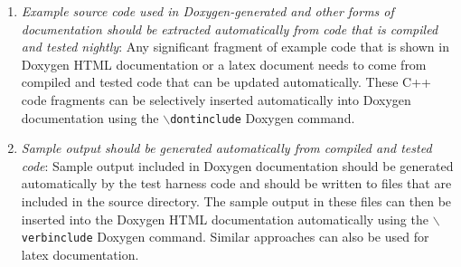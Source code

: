 \begin{enumerate}
{\begin{verbatim}
    /** \name Overriden from Teuchos::ParameterListAccpetor */
    //@{

    /** \brief . */
    void setParameterList(
      Teuchos::RefCountPtr<Teuchos::ParameterList> const& paramList);
    /** \brief . */
    Teuchos::RefCountPtr<Teuchos::ParameterList> getParameterList();
    /** \brief . */
    Teuchos::RefCountPtr<Teuchos::ParameterList> unsetParameterList();
    /** \brief . */
    Teuchos::RefCountPtr<const Teuchos::ParameterList> getParameterList() const;
    /** \brief . */
    Teuchos::RefCountPtr<const Teuchos::ParameterList> getValidParameters() const;

    //@}

    ...

  };

\end{verbatim}}

{}\item\textit{Example source code used in Doxygen-generated and other forms
of documentation should be extracted automatically from code that is compiled
and tested nightly}: Any significant fragment of example code that is shown in
Doxygen HTML documentation or a latex document needs to come from compiled and
tested code that can be updated automatically.  These C++ code fragments can
be selectively inserted automatically into Doxygen documentation using the
{}\texttt{$\backslash$dontinclude} Doxygen command.

{}\item\textit{Sample output should be generated automatically from compiled
and tested code}: Sample output included in Doxygen documentation should be
generated automatically by the test harness code and should be written to
files that are included in the source directory.  The sample output in these
files can then be inserted into the Doxygen HTML documentation automatically
using the {}\texttt{$\backslash$verbinclude} Doxygen command.  Similar
approaches can also be used for latex documentation.

\end{enumerate}
